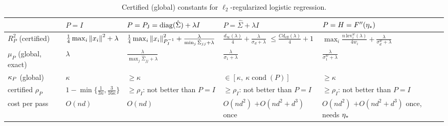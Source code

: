 \begin{table}[ht]
\centering
\footnotesize
\renewcommand{\arraystretch}{1.3}
\begin{tabular}{@{}p{2.0cm}p{2.6cm}p{3.2cm}p{3.4cm}p{3.4cm}@{}}
\toprule
 & $P=I$ & $P=P_{\mathrm J}=\operatorname{diag}(\hat\Sigma)+\lambda I$ & $P=\hat\Sigma+\lambda I$ & $P=H=F''(\eta_\ast)$ \\
\midrule
$R_P^2$ (certified) & $\frac14\max_i\left\|x_i\right\|^2+\lambda$
 & $\frac14\max_i\left\|x_i\right\|_{P_{\mathrm J}^{-1}}^2+\frac{\lambda}{\min_j\hat\Sigma_{jj}+\lambda}$
 & $\frac{d_\infty(\lambda)}4+\frac{\lambda}{\sigma_d+\lambda}$ \newline $\le\frac{Cd_{\mathrm{eff}}(\lambda)}4+1$
 & $\max_i\frac{n\,\mathrm{lev}^w_i(\lambda)}{4w_i}+\frac{\lambda}{\sigma^w_d+\lambda}$ \\[2pt]
$\mu_P$ (global, exact) & $\lambda$ & $\frac{\lambda}{\max_j\hat\Sigma_{jj}+\lambda}$
 & $\frac{\lambda}{\sigma_1+\lambda}$ & $\frac{\lambda}{\sigma^w_1+\lambda}$ \\[2pt]
$\kappa_P$ (global) & $\kappa$ & $\ge\kappa$ & $\in[\kappa,\ \kappa\operatorname{cond}(P)]$ & $\ge\kappa$ \\[2pt]
certified $\rho_P$ & $1-\min\{\frac1{3n},\frac3{16\kappa}\}$ & $\ge\rho_I$: not better than $P=I$ & $\ge\rho_I$: not better than $P=I$ & $\ge\rho_I$: not better than $P=I$ \\[2pt]
cost per pass & $O(nd)$ & $O(nd)$ & $O(nd^2)$ $+O(nd^2+d^3)$ once & $O(nd^2)$ $+O(nd^2+d^3)$ once, needs $\eta_\ast$ \\
\bottomrule
\end{tabular}
\caption{Certified (global) constants for $\ell_2$-regularized logistic regression.}
\label{tab:B1-predictions-global}
\end{table}

